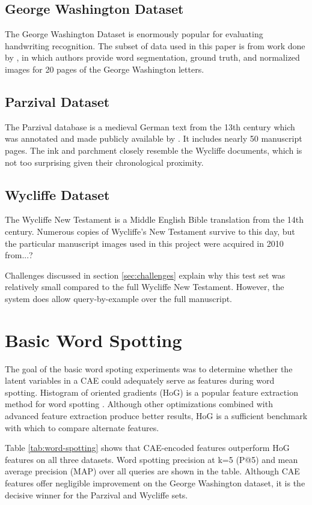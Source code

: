 \documentclass[final]{ukthesis}
\begin{document}
\subsection{George Washington Dataset}
The George Washington Dataset is enormously popular for evaluating handwriting recognition. The subset of data used in this paper is from work done by \cite{fischer2012lexicon}, in which authors provide word segmentation, ground truth, and normalized images for 20 pages of the George Washington letters.

\subsection{Parzival Dataset}
The Parzival database is a medieval German text from the 13th century which was annotated and made publicly available by \cite{fischer2010ground}. It includes nearly 50 manuscript pages. The ink and parchment closely resemble the Wycliffe documents, which is not too surprising given their chronological proximity.

\subsection{Wycliffe Dataset}
The Wycliffe New Testament is a Middle English Bible translation from the 14th century. Numerous copies of Wycliffe's New Testament survive to this day, but the particular manuscript images used in this project were acquired in 2010 from...?

Challenges discussed in section \ref{sec:challenges} explain why this test set was relatively small compared to the full Wycliffe New Testament. However, the system does allow query-by-example over the full manuscript.


%
%
\section{Basic Word Spotting}
\label{sec:basic-results}
The goal of the basic word spoting experiments was to determine whether the latent variables in a CAE could adequately serve as features during word spotting. Histogram of oriented gradients (HoG) is a popular feature extraction method for word spotting \cite{giotis2017survey}. Although other optimizations combined with advanced feature extraction produce better results, HoG is a sufficient benchmark with which to compare alternate features.

Table \ref{tab:word-spotting} shows that CAE-encoded features outperform HoG features on all three datasets. Word spotting precision at k=5 (P@5) and mean average precision (MAP) over all queries are shown in the table. Although CAE features offer negligible improvement on the George Washington dataset, it is the decisive winner for the Parzival and Wycliffe sets.
\end{document}
